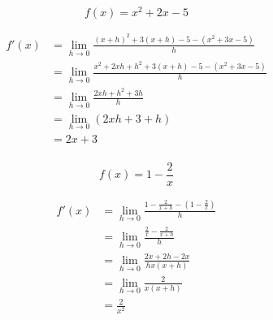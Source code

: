 \documentclass[letterpaper]{exam}
\begin{document}
\begin{questions}
\begin{solution}
      \end{solution}


      \question[8] 
      \label{derivative:first}
      \[
        f(x) = x^2 + 2x - 5
      \]

      \begin{solution}
        \begin{align*}
          f'(x) & = \lim_{h \to 0} \frac{(x + h)^2 + 3(x + h) - 5 - \left( x^2 + 3x - 5 \right)}{h} \\
                & = \lim_{h \to 0} \frac{x^2 + 2xh + h^2 + 3(x + h) - 5 - \left( x^2 + 3x - 5 \right)}{h} \\
                & = \lim_{h \to 0} \frac{2xh + h^2 + 3h}{h} \\
                & = \lim_{h \to 0} (2xh + 3 + h) \\
                & = \boxed{ 2x + 3 } \\
        \end{align*}
      \end{solution}

      \question[8] 
      \label{derivative:last}
      \[
        f(x) = 1 - \frac{2}{x}
      \]

      \begin{solution}
        \begin{align*}
          f'(x) & = \lim_{h \to 0} \frac{1 - \frac{2}{x + h} - \left( 1 - \frac{2}{x} \right)}{h} \\
                &= \lim_{h \to 0} \frac{\frac{2}{x} - \frac{2}{x+h}}{h} \\
                &= \lim_{h \to 0} \frac{2x + 2h - 2x}{hx(x + h)} \\
                &= \lim_{h \to 0} \frac{2}{x(x + h)} \\
                &= \boxed{ \frac{2}{x^2} } \\
        \end{align*}
      \end{solution}
      

\end{questions}
\end{document}
